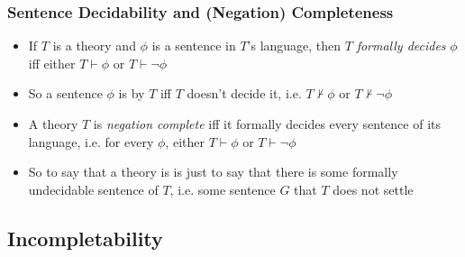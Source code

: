\begin{frame}
\frametitle{Sentence Decidability and (Negation) Completeness}

\begin{itemize}[<+->]

\item If $T$ is a theory and $\phi$ is a sentence in $T$'s language, then $T$ \emph{formally decides} $\phi$ iff either $T \vdash \phi$ or $T \vdash \neg \phi$

\item So a sentence $\phi$ is  by $T$ iff $T$ doesn't decide it, i.e. $T \nvdash \phi$ or $T \nvdash \neg \phi$

\item A theory $T$ is \emph{negation complete} iff it formally decides every sentence of its language, i.e. for every $\phi$, either $T \vdash \phi$ or $T \vdash \neg \phi$

\item So to say that a theory is  is just to say that there is some formally undecidable sentence of $T$, i.e. some sentence $G$ that $T$ does not settle




\end{itemize}
\end{frame}




\subsection{Incompletability}

